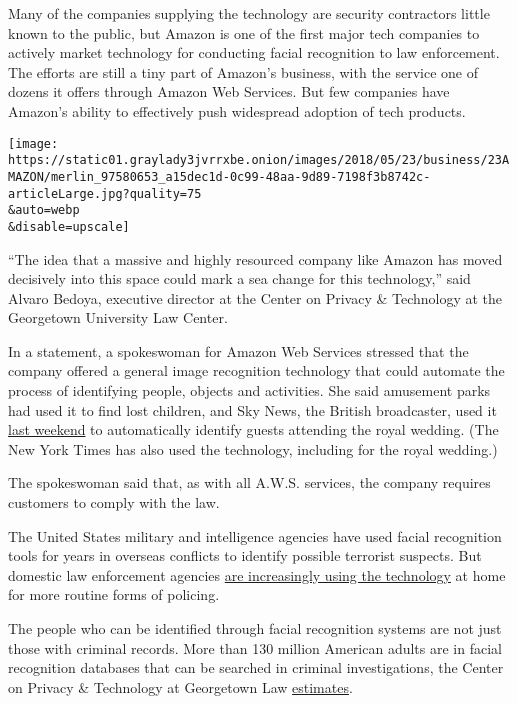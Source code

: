 Many of the companies supplying the technology are security contractors
little known to the public, but Amazon is one of the first major tech
companies to actively market technology for conducting facial
recognition to law enforcement. The efforts are still a tiny part of
Amazon's business, with the service one of dozens it offers through
Amazon Web Services. But few companies have Amazon's ability to
effectively push widespread adoption of tech products.

\texttt{[image: https://static01.graylady3jvrrxbe.onion/images/2018/05/23/business/23AMAZON/merlin\_97580653\_a15dec1d-0c99-48aa-9d89-7198f3b8742c-articleLarge.jpg?quality=75\\\&auto=webp\\\&disable=upscale]}

``The idea that a massive and highly resourced company like Amazon has
moved decisively into this space could mark a sea change for this
technology,'' said Alvaro Bedoya, executive director at the Center on
Privacy \& Technology at the Georgetown University Law Center.

In a statement, a spokeswoman for Amazon Web Services stressed that the
company offered a general image recognition technology that could
automate the process of identifying people, objects and activities. She
said amusement parks had used it to find lost children, and Sky News,
the British broadcaster, used it
\href{http://www.streamingmedia.com/PressRelease/Sky-to-Launch-Live-Whos-Who-innovation-for-Royal-Wedding_47055.aspx}{last
weekend} to automatically identify guests attending the royal wedding.
(The New York Times has also used the technology, including for the
royal wedding.)

The spokeswoman said that, as with all A.W.S. services, the company
requires customers to comply with the law.

The United States military and intelligence agencies have used facial
recognition tools for years in overseas conflicts to identify possible
terrorist suspects. But domestic law enforcement agencies
\href{https://www.nytimes3xbfgragh.onion/2015/08/13/us/facial-recognition-software-moves-from-overseas-wars-to-local-police.html}{are
increasingly using the technology} at home for more routine forms of
policing.

The people who can be identified through facial recognition systems are
not just those with criminal records. More than 130 million American
adults are in facial recognition databases that can be searched in
criminal investigations, the Center on Privacy \& Technology at
Georgetown Law \href{https://www.perpetuallineup.org/}{estimates}.

